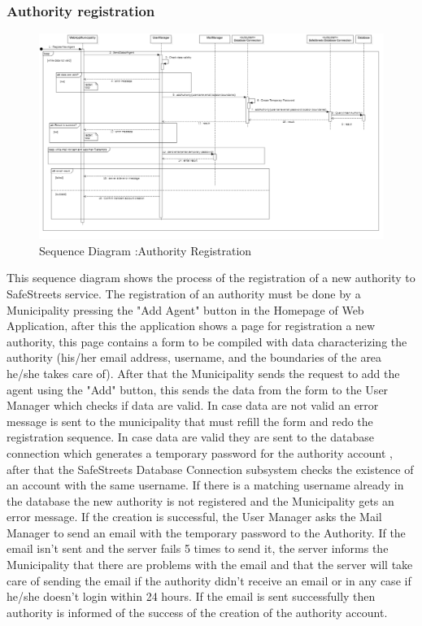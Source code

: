 \subsubsection{Authority registration}
\begin{figure}[H]
\centering
\includegraphics[width=\textwidth]{Images/SequenceAuthorityRegistration.png}
\caption{\label{fig:ComWI}Sequence Diagram :Authority Registration}
\end{figure}
This sequence diagram shows the process of the registration of a new authority to SafeStreets service.
The registration of an authority must be done by a Municipality pressing the "Add Agent" button in the
Homepage of Web Application, after this the application shows a page for registration a new authority, this page contains a form to be compiled with data characterizing the authority (his/her email address,
username, and the boundaries of the area he/she takes care of). After that the Municipality sends the
request to add the agent using the "Add" button, this sends the data from the form to the User Manager
which checks if data are valid. In case data are not valid an error message is sent to the municipality that
must refill the form and redo the registration sequence. In case data are valid they are sent to the database
connection which generates a temporary password for the authority account , after that the SafeStreets
Database Connection subsystem checks the existence of an account with the same username. If there
is a matching username already in the database the new authority is not registered and the Municipality
gets an error message. If the creation is successful, the User Manager asks the Mail Manager to send an
email with the temporary password to the Authority. If the email isn’t sent and the server fails 5 times
to send it, the server informs the Municipality that there are problems with the email and that the server
will take care of sending the email if the authority didn’t receive an email or in any case if he/she doesn’t
login within 24 hours. If the email is sent successfully then authority is informed of the success of the
creation of the authority account.
